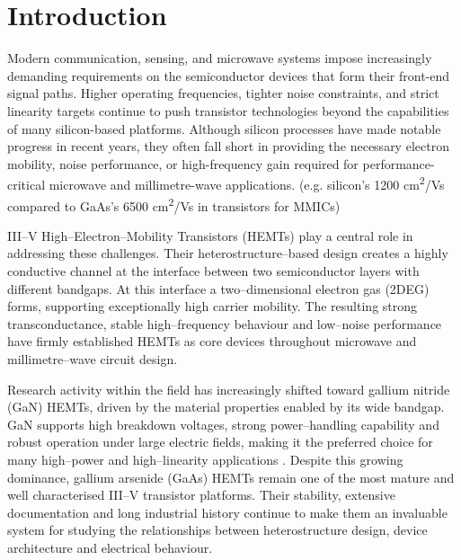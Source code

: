 \chapter{Introduction}

Modern communication, sensing, and microwave systems impose increasingly 
demanding requirements on the semiconductor devices that form their 
front-end signal paths. Higher operating frequencies, tighter noise 
constraints, and strict linearity targets continue to push transistor 
technologies beyond the capabilities of many silicon-based platforms. \cite{chaturvedi2021}
Although silicon processes have made notable progress in recent years, 
they often fall short in providing the necessary electron mobility,
 noise performance, or high-frequency gain required for performance-critical 
microwave and millimetre-wave applications. 
(e.g. silicon's 1200 cm\textsuperscript{2}/Vs compared to GaAs's 6500 cm\textsuperscript{2}/Vs 
in transistors for MMICs) \cite{chaturvedi2021}

\vspace{2mm}

III--V High--Electron--Mobility Transistors (HEMTs) play a central role in 
addressing these challenges. Their heterostructure--based design creates a 
highly conductive channel at the interface between two semiconductor layers 
with different bandgaps. At this interface a two--dimensional electron gas (2DEG) 
forms, supporting exceptionally high carrier mobility. The resulting strong 
transconductance, stable high--frequency behaviour and low--noise performance 
have firmly established HEMTs as core devices throughout microwave and 
millimetre--wave circuit design. \cite{mishra2002}

\vspace{2mm}

Research activity within the field has increasingly shifted toward 
gallium nitride (GaN) HEMTs, driven by the material properties enabled 
by its wide bandgap. GaN supports high breakdown voltages, strong 
power--handling capability and robust operation under large electric 
fields, making it the preferred choice for many high--power and 
high--linearity applications \cite{mishra2008}. Despite this growing dominance, 
gallium arsenide (GaAs) HEMTs remain one of the most mature and well 
characterised III--V transistor platforms. Their stability, extensive 
documentation and long industrial history continue to make them an 
invaluable system for studying the relationships between heterostructure 
design, device architecture and electrical behaviour. \cite{Mimura2002,Mimura1980} 

